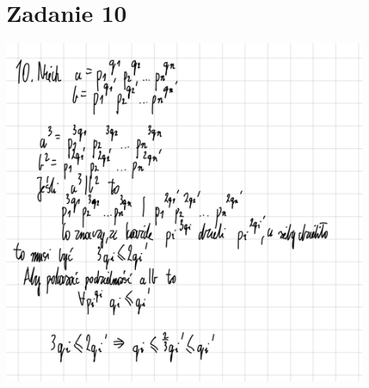 \documentclass[12pt]{article}
\begin{document}
\section{Zadanie 10}
\includegraphics[width=120mm]{zad10}

\egroup
\end{document}
